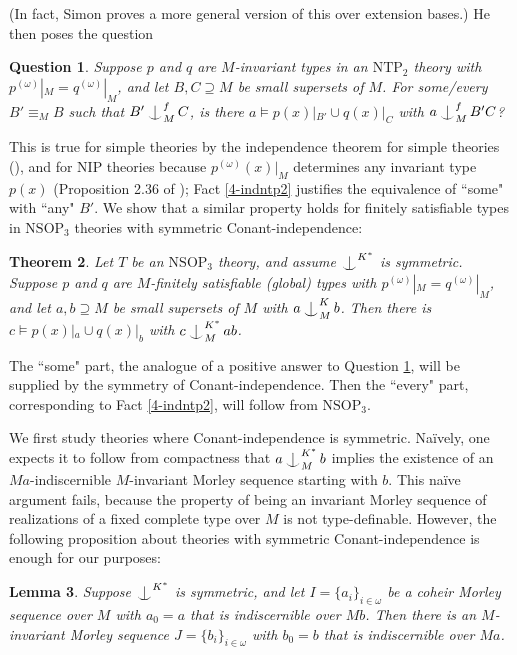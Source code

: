 \documentclass[12pt]{amsart}
\newtheorem{theorem}{Theorem}[section]
\newtheorem{lemma}[theorem]{Lemma}
\newtheorem{question}[theorem]{Question}
\theoremstyle{definition}
\def\Ind#1#2{#1\setbox0=\hbox{$#1x$}\kern\wd0\hbox to 0pt{\hss$#1\mid$\hss}
\lower.9\ht0\hbox to 0pt{\hss$#1\smile$\hss}\kern\wd0}
\def\ind{\mathop{\mathpalette\Ind{}}}
\begin{document}
(In fact, Simon proves a more general version of this over extension bases.) He then poses the question

\begin{question}\label{4-simon?}
Suppose $p$ and $q$ are $M$-invariant types in an $\mathrm{NTP}_{2}$ theory with $p^{(\omega)}|_{M} = q^{(\omega)}|_{M}$, and let $B, C \supseteq M$ be small supersets of $M$. For some/every $B' \equiv_{M} B$ such that $B' \ind^{f}_{M} C$, is there $a \models p(x)|_{B'} \cup q(x)|_{C}$ with $a \ind^{f}_{M} B'C$?

\end{question}

This is true for simple theories by the independence theorem for simple theories (\cite{KP99}), and for NIP theories because $p^{(\omega)}(x)|_{M}$ determines any invariant type $p(x)$ (Proposition 2.36 of \cite{sim12}); Fact \ref{4-indntp2} justifies the equivalence of ``some" with ``any" $B'$. We show that a similar property holds for finitely satisfiable types in $\mathrm{NSOP}_{3}$ theories with symmetric Conant-independence:

\begin{theorem} \label{4-main5}
Let $T$ be an $\mathrm{NSOP}_{3}$ theory, and assume $\ind^{K^{*}}$ is symmetric. Suppose $p$ and $q$ are $M$-finitely satisfiable (global) types with $p^{(\omega)}|_{M} = q^{(\omega)}|_{M}$, and let $a, b \supseteq M$ be small supersets of $M$ with $a \ind^{K}_{M} b$. Then there is $c \models p(x)|_{a} \cup q(x)|_{b}$ with $c \ind^{K^{*}}_{M} ab$.

\end{theorem}

The ``some" part, the analogue of a positive answer to Question \ref{4-simon?}, will be supplied by the symmetry of Conant-independence. Then the ``every" part, corresponding to Fact \ref{4-indntp2}, will follow from $\mathrm{NSOP}_{3}$. 

We first study theories where Conant-independence is symmetric. Naïvely, one expects it to follow from compactness that $a\ind^{K^{*}}_{M}b$ implies the existence of an $Ma$-indiscernible $M$-invariant Morley sequence starting with $b$. This naïve argument fails, because the property of being an invariant Morley sequence of realizations of a fixed complete type over $M$ is not type-definable. However, the following proposition about theories with symmetric Conant-independence is enough for our purposes:

\begin{lemma}\label{4-symm5}
Suppose $\ind^{K^{*}}$ is symmetric, and let $I =\{a_{i}\}_{i \in \omega}$ be a coheir Morley sequence over $M$ with $a_{0}=a$ that is indiscernible over $Mb$. Then there is an $M$-invariant Morley sequence $J = \{b_{i}\}_{i\in \omega}$ with $b_{0}=b$ that is indiscernible over $Ma$.

\end{lemma}
\end{document}
